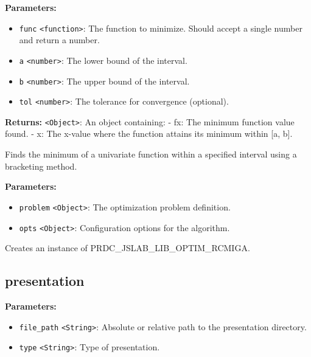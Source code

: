 \documentclass[12pt,a4paper]{article}
\begin{document}
\noindent \textbf{Parameters:}
\begin{itemize}
  \item \texttt{func} \texttt{<function>}: The function to minimize. Should accept a single number and return a number.
  \item \texttt{a} \texttt{<number>}: The lower bound of the interval.
  \item \texttt{b} \texttt{<number>}: The upper bound of the interval.
  \item \texttt{tol} \texttt{<number>}: The tolerance for convergence (optional).
\end{itemize}

\noindent \textbf{Returns:} \texttt{<Object>}: An object containing:
  - \textasciigrave{}fx\textasciigrave{}: The minimum function value found.
  - \textasciigrave{}x\textasciigrave{}: The x-value where the function attains its minimum within [a, b].

\noindent Finds the minimum of a univariate function within a specified interval using a bracketing method.

\vspace{5mm}
\noindent {}


\noindent \textbf{Parameters:}
\begin{itemize}
  \item \texttt{problem} \texttt{<Object>}: The optimization problem definition.
  \item \texttt{opts} \texttt{<Object>}: Configuration options for the algorithm.
\end{itemize}

\noindent Creates an instance of PRDC\_JSLAB\_LIB\_OPTIM\_RCMIGA.


\subsection{presentation}
\vspace{5mm}
\noindent {}


\noindent \textbf{Parameters:}
\begin{itemize}
  \item \texttt{file\_path} \texttt{<String>}: Absolute or relative path to the presentation directory.
  \item \texttt{type} \texttt{<String>}: Type of presentation.
\end{itemize}
\end{document}
